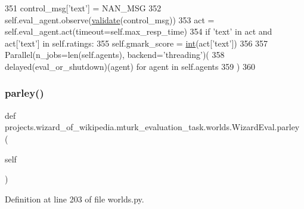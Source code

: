 \begin{DoxyCode}
351                     control\_msg[\textcolor{stringliteral}{'text'}] = NAN\_MSG
352                     self.eval\_agent.observe(\hyperlink{namespaceparlai_1_1core_1_1worlds_afc3fad603b7bce41dbdc9cdc04a9c794}{validate}(control\_msg))
353                     act = self.eval\_agent.act(timeout=self.max\_resp\_time)
354                 \textcolor{keywordflow}{if} \textcolor{stringliteral}{'text'} \textcolor{keywordflow}{in} act \textcolor{keywordflow}{and} act[\textcolor{stringliteral}{'text'}] \textcolor{keywordflow}{in} self.ratings:
355                     self.gmark\_score = \hyperlink{namespacelanguage__model_1_1eval__ppl_a7d12ee00479673c5c8d1f6d01faa272a}{int}(act[\textcolor{stringliteral}{'text'}])
356 
357         Parallel(n\_jobs=len(self.agents), backend=\textcolor{stringliteral}{'threading'})(
358             delayed(eval\_or\_shutdown)(agent) \textcolor{keywordflow}{for} agent \textcolor{keywordflow}{in} self.agents
359         )
360 
\end{DoxyCode}
\mbox{\label{classprojects_1_1wizard__of__wikipedia_1_1mturk__evaluation__task_1_1worlds_1_1WizardEval_abfff1c20503e898e721969580c160f67}} 
\subsubsection{\texorpdfstring{parley()}{parley()}}
{\footnotesize\ttfamily def projects.\+wizard\+\_\+of\+\_\+wikipedia.\+mturk\+\_\+evaluation\+\_\+task.\+worlds.\+Wizard\+Eval.\+parley (\begin{DoxyParamCaption}\item[{}]{self }\end{DoxyParamCaption})}



Definition at line 203 of file worlds.\+py.


